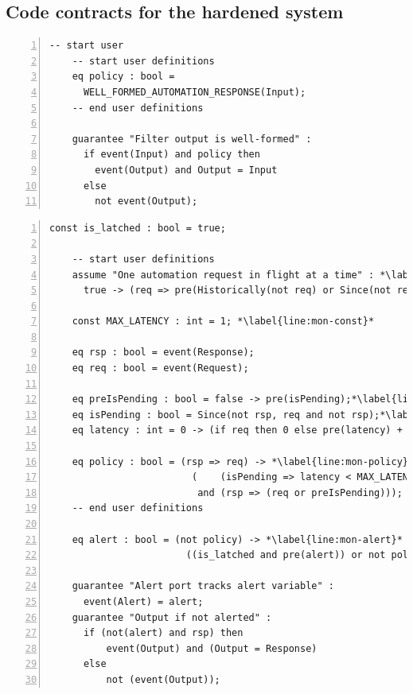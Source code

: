 \documentclass[global,twocolumn]{svjour}
\begin{document}
\subsection{Code contracts for the hardened system}
\label{sec:ha-contracts}

\newsavebox{\flt}
\begin{lrbox}{\flt}
  \begin{lstlisting}[style=agree,numbers=left] -- start user
    -- start user definitions
    eq policy : bool =
      WELL_FORMED_AUTOMATION_RESPONSE(Input);
    -- end user definitions

    guarantee "Filter output is well-formed" :
      if event(Input) and policy then
        event(Output) and Output = Input
      else
        not event(Output);
  \end{lstlisting}
\end{lrbox}

\newsavebox{\mntr}
\begin{lrbox}{\mntr}
  \begin{lstlisting}[style=agree,numbers=left]
    const is_latched : bool = true;

    -- start user definitions
    assume "One automation request in flight at a time" : *\label{line:mon-assume}*
      true -> (req => pre(Historically(not req) or Since(not req, rsp)));

    const MAX_LATENCY : int = 1; *\label{line:mon-const}*

    eq rsp : bool = event(Response);
    eq req : bool = event(Request);

    eq preIsPending : bool = false -> pre(isPending);*\label{line:mon-pre-pending}*
    eq isPending : bool = Since(not rsp, req and not rsp);*\label{line:mon-pending}*
    eq latency : int = 0 -> (if req then 0 else pre(latency) + 1);*\label{line:mon-latency}*

    eq policy : bool = (rsp => req) -> *\label{line:mon-policy}*
                         (    (isPending => latency < MAX_LATENCY)
                          and (rsp => (req or preIsPending)));
    -- end user definitions

    eq alert : bool = (not policy) -> *\label{line:mon-alert}*
                        ((is_latched and pre(alert)) or not policy);

    guarantee "Alert port tracks alert variable" :
      event(Alert) = alert;
    guarantee "Output if not alerted" :
      if (not(alert) and rsp) then
          event(Output) and (Output = Response)
      else
          not (event(Output));
  \end{lstlisting}
\end{lrbox}
\end{document}
